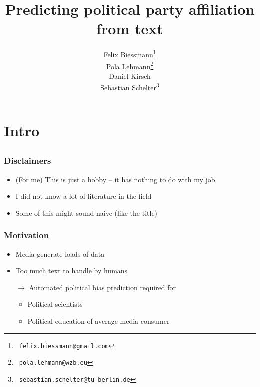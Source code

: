 \documentclass[]{beamer}
\institute[]{}
\title[]{
{
Predicting political party affiliation from text
}}
\author{
Felix Biessmann\thanks{~\tt felix.biessmann@gmail.com}\\
 Pola Lehmann\thanks{ ~{\tt pola.lehmann@wzb.eu} }\\
Daniel Kirsch\\
  Sebastian Schelter\thanks{~\tt sebastian.schelter@tu-berlin.de}\\
}
\begin{document}
\begin{frame} 
\titlepage 
\end{frame}	

%
\section{Intro}
\subsection{}

\begin{frame}\frametitle{Disclaimers}
\small
\begin{itemize}[<+->]
\item (For me) This is just a hobby -- it has nothing to do with my job
\item I did not know a lot of literature in the field 
\item Some of this might sound naive (like the title)
\end{itemize}
\end{frame}

\begin{frame}\frametitle{Motivation}
\begin{itemize}[<+->]
\item Media generate loads of data
\item Too much text to handle by humans
\item[$\rightarrow$] Automated political bias prediction required for 
\begin{itemize}
\item Political scientists
\item Political education of average media consumer
\end{itemize}
\end{itemize}
\end{frame}
\end{document}
